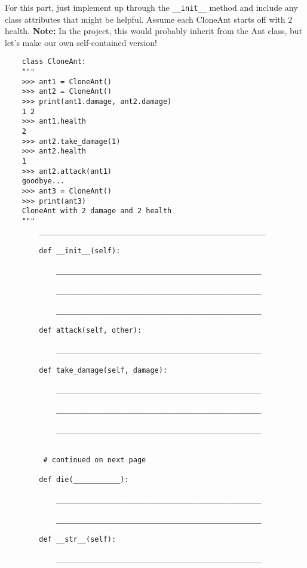 \question For this part, just implement up through the \texttt{\_\_init\_\_} method and include any class attributes that might be helpful. Assume each CloneAnt starts off with 2 health. 
    \textbf{Note:} In the project, this would probably inherit from the Ant class, but let's make our own self-contained version!
    \newpage
    \begin{lstlisting}
    class CloneAnt:
    """
    >>> ant1 = CloneAnt()
    >>> ant2 = CloneAnt()
    >>> print(ant1.damage, ant2.damage)
    1 2
    >>> ant1.health
    2
    >>> ant2.take_damage(1)
    >>> ant2.health
    1
    >>> ant2.attack(ant1)
    goodbye...
    >>> ant3 = CloneAnt()
    >>> print(ant3)
    CloneAnt with 2 damage and 2 health
    """
        _____________________________________________________

        def __init__(self):

            ________________________________________________

            ________________________________________________

            ________________________________________________

        def attack(self, other):

            ________________________________________________

        def take_damage(self, damage):

            ________________________________________________

            ________________________________________________

            ________________________________________________


         # continued on next page   

        def die(___________):

            ________________________________________________

            ________________________________________________

        def __str__(self):
           
            ________________________________________________
    \end{lstlisting}

